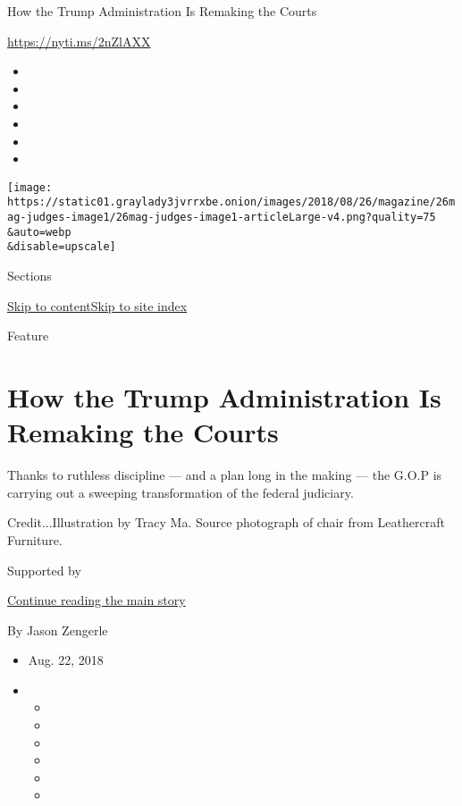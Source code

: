How the Trump Administration Is Remaking the Courts

\url{https://nyti.ms/2nZlAXX}

\begin{itemize}
\item
\item
\item
\item
\item
\item
\end{itemize}

\texttt{[image: https://static01.graylady3jvrrxbe.onion/images/2018/08/26/magazine/26mag-judges-image1/26mag-judges-image1-articleLarge-v4.png?quality=75\\\&auto=webp\\\&disable=upscale]}

Sections

\protect\hyperlink{site-content}{Skip to
content}\protect\hyperlink{site-index}{Skip to site index}

Feature

\hypertarget{how-the-trump-administration-is-remaking-the-courts}{%
\section{How the Trump Administration Is Remaking the
Courts}\label{how-the-trump-administration-is-remaking-the-courts}}

Thanks to ruthless discipline --- and a plan long in the making --- the
G.O.P is carrying out a sweeping transformation of the federal
judiciary.

Credit...Illustration by Tracy Ma. Source photograph of chair from
Leathercraft Furniture.

Supported by

\protect\hyperlink{after-sponsor}{Continue reading the main story}

By Jason Zengerle

\begin{itemize}
\item
  Aug. 22, 2018
\item
  \begin{itemize}
  \item
  \item
  \item
  \item
  \item
  \item
  \end{itemize}
\end{itemize}

